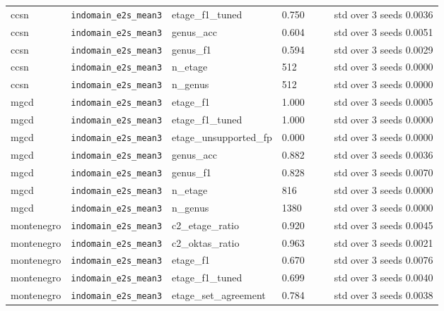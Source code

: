 \begin{center}
{\begin{tabular}{lllllll}
ccsn & \texttt{indomain\_\allowbreak{}e2s\_\allowbreak{}mean3} & etage\_f1\_tuned & 0.750 &  &  & std over 3 seeds 0.0036 \\
ccsn & \texttt{indomain\_\allowbreak{}e2s\_\allowbreak{}mean3} & genus\_acc & 0.604 &  &  & std over 3 seeds 0.0051 \\
ccsn & \texttt{indomain\_\allowbreak{}e2s\_\allowbreak{}mean3} & genus\_f1 & 0.594 &  &  & std over 3 seeds 0.0029 \\
ccsn & \texttt{indomain\_\allowbreak{}e2s\_\allowbreak{}mean3} & n\_etage & 512 &  &  & std over 3 seeds 0.0000 \\
ccsn & \texttt{indomain\_\allowbreak{}e2s\_\allowbreak{}mean3} & n\_genus & 512 &  &  & std over 3 seeds 0.0000 \\
mgcd & \texttt{indomain\_\allowbreak{}e2s\_\allowbreak{}mean3} & etage\_f1 & 1.000 &  &  & std over 3 seeds 0.0005 \\
mgcd & \texttt{indomain\_\allowbreak{}e2s\_\allowbreak{}mean3} & etage\_f1\_tuned & 1.000 &  &  & std over 3 seeds 0.0000 \\
mgcd & \texttt{indomain\_\allowbreak{}e2s\_\allowbreak{}mean3} & etage\_unsupported\_fp & 0.000 &  &  & std over 3 seeds 0.0000 \\
mgcd & \texttt{indomain\_\allowbreak{}e2s\_\allowbreak{}mean3} & genus\_acc & 0.882 &  &  & std over 3 seeds 0.0036 \\
mgcd & \texttt{indomain\_\allowbreak{}e2s\_\allowbreak{}mean3} & genus\_f1 & 0.828 &  &  & std over 3 seeds 0.0070 \\
mgcd & \texttt{indomain\_\allowbreak{}e2s\_\allowbreak{}mean3} & n\_etage & 816 &  &  & std over 3 seeds 0.0000 \\
mgcd & \texttt{indomain\_\allowbreak{}e2s\_\allowbreak{}mean3} & n\_genus & 1380 &  &  & std over 3 seeds 0.0000 \\
montenegro & \texttt{indomain\_\allowbreak{}e2s\_\allowbreak{}mean3} & c2\_etage\_ratio & 0.920 &  &  & std over 3 seeds 0.0045 \\
montenegro & \texttt{indomain\_\allowbreak{}e2s\_\allowbreak{}mean3} & c2\_oktas\_ratio & 0.963 &  &  & std over 3 seeds 0.0021 \\
montenegro & \texttt{indomain\_\allowbreak{}e2s\_\allowbreak{}mean3} & etage\_f1 & 0.670 &  &  & std over 3 seeds 0.0076 \\
montenegro & \texttt{indomain\_\allowbreak{}e2s\_\allowbreak{}mean3} & etage\_f1\_tuned & 0.699 &  &  & std over 3 seeds 0.0040 \\
montenegro & \texttt{indomain\_\allowbreak{}e2s\_\allowbreak{}mean3} & etage\_set\_agreement & 0.784 &  &  & std over 3 seeds 0.0038 \\

\end{tabular}}
\end{center}
